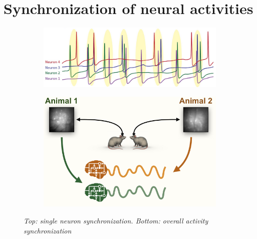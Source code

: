\documentclass[12pt, a4paper]{report}
\begin{document}
\section{Synchronization of neural activities} \label{section 1.5}

\begin{figure}[H]
	\begin{minipage}{\linewidth}
		\centering
		\begin{minipage}{0.6\linewidth}
			\begin{figure}[H]
				\includegraphics[width=\linewidth]{synch.png}
				
			\end{figure}
		\end{minipage}
		\hspace{0.05\linewidth}
		\begin{minipage}{0.6\linewidth}
			\begin{figure}[H]
				\includegraphics[width=\linewidth]{Intebrain.png}
				
			\end{figure}
		\end{minipage}
		
	\end{minipage}
\caption{\textit{Top: single neuron synchronization.
		Bottom: overall activity synchronization}} \label{synch}
\end{figure}
\end{document}
